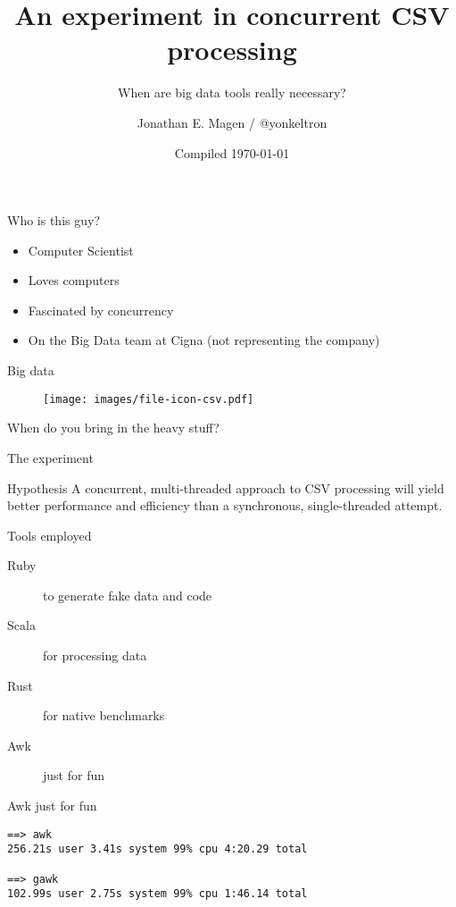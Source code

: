 \documentclass[aspectratio=169]{beamer}
\title{An experiment in concurrent CSV processing}
\subtitle{When are big data tools really necessary?}
\author{Jonathan E. Magen / \faicon{twitter} @yonkeltron}
\date{Compiled \today}
\newcommand{\megatext}[1]{
  \begin{center}
    \Huge
    #1
  \end{center}
}
\begin{document}
\frame{\titlepage}

\begin{frame}{Who is this guy?}
  \begin{itemize}
  \item Computer Scientist
  \item Loves computers
  \item Fascinated by concurrency
  \item On the Big Data team at Cigna (not representing the company)
  \end{itemize}
\end{frame}


\begin{frame}
  \megatext{Big data}
\end{frame}

\begin{frame}
  \begin{figure}
    \texttt{[image: images/file-icon-csv.pdf]}
  \end{figure}
\end{frame}

\begin{frame}
  \megatext{When do you bring in the heavy stuff?}
\end{frame}

\begin{frame}{The experiment}
  \begin{block}{Hypothesis}
    A concurrent, multi-threaded approach to CSV processing will yield better performance and efficiency than a synchronous, single-threaded attempt.
  \end{block}

  \begin{block}{Tools employed}
    \begin{description}
    \item[Ruby] to generate fake data and code
    \item[Scala] for processing data
    \item[Rust] for native benchmarks
    \item[Awk] just for fun
    \end{description}
  \end{block}
\end{frame}


\begin{frame}[fragile]{Awk just for fun}
  \begin{verbatim}
==> awk
256.21s user 3.41s system 99% cpu 4:20.29 total

==> gawk
102.99s user 2.75s system 99% cpu 1:46.14 total
  \end{verbatim}
\end{frame}
\end{document}
